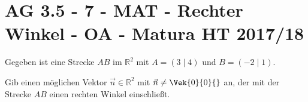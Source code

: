\section{AG 3.5 - 7 - MAT - Rechter Winkel - OA - Matura HT 2017/18}

\begin{beispiel}[AG 3.5]{1} %
Gegeben ist eine Strecke $AB$ im $\mathbb{R}^2$ mit $A=(3\mid 4)$ und $B=(-2\mid 1)$.

Gib einen möglichen Vektor $\vec{n}\in\mathbb{R}^2$ mit $\vec{n}\neq\Vek{0}{0}{}$ an, der mit der Strecke $AB$ einen rechten Winkel einschließt.\leer

\end{beispiel}